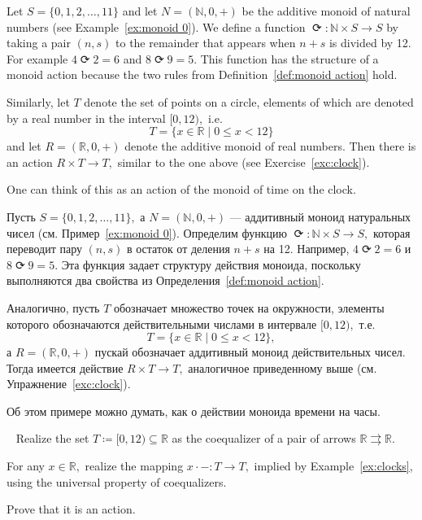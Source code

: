 \documentclass[../main/CT4S-EN-RU]{subfiles}
\begin{document}
\begin{exampleENG}\label{ex:clocks}
Let $S=\{0,1,2,\ldots,11\}$ and let $N=({ℕ},0,+)$ be the additive monoid of natural numbers (see Example~\ref{ex:monoid 0}).  We define a function ${⟳}\colon{ℕ}\times S{→} S$ by taking a pair $(n,s)$ to the remainder that appears when $n+s$ is divided by 12. For example $4{⟳} 2=6$ and $8{⟳} 9 = 5.$ This function has the structure of a monoid action because the two rules from Definition~\ref{def:monoid action} hold.

Similarly, let $T$ denote the set of points on a circle, elements of which are denoted by a real number in the interval $[0,12),$ i.e. $$T=\{x\in{ℝ}{\;|\;}0\leq x< 12\}$$ and let $R=({ℝ},0,+)$ denote the additive monoid of real numbers. Then there is an action $R\times T{→} T,$ similar to the one above (see Exercise~\ref{exc:clock}).

One can think of this as an action of the monoid of time on the clock.
\end{exampleENG}

\begin{exampleRUS}\label{ex:clocks}
Пусть $S=\{0,1,2,\ldots,11\},$ а $N=({ℕ},0,+)$ — аддитивный моноид натуральных чисел (см. Пример~\ref{ex:monoid 0}). Определим функцию ${⟳}\colon{ℕ}\times S{→} S,$ которая переводит пару $(n,s)$ в остаток от деления $n+s$ на 12. Например, $4{⟳} 2=6$ и $8{⟳} 9 = 5.$ Эта функция задает структуру действия моноида, поскольку выполняются два свойства из Определения~\ref{def:monoid action}.

Аналогично, пусть $T$ обозначает множество точек на окружности, элементы которого обозначаются действительными числами в интервале $[0,12),$ т.е. $$T=\{x\in{ℝ}{\;|\;}0\leq x< 12\},$$ а $R=({ℝ},0,+)$ пускай обозначает аддитивный моноид действительных чисел. Тогда имеется действие $R\times T{→} T,$ аналогичное приведенному выше (см. Упражнение~\ref{exc:clock}).

Об этом примере можно думать, как о действии моноида времени на часы.
\end{exampleRUS}

\begin{exerciseENG}\label{exc:clock}~
\sexc Realize the set $T{\coloneqq}[0,12)\subseteq{ℝ}$ as the coequalizer of a pair of arrows ${ℝ}{⇉}{ℝ}.$
\item For any $x\in{ℝ},$ realize the mapping $x\cdot-\colon T{→} T,$ implied by Example~\ref{ex:clocks}, using the universal property of coequalizers.
\item Prove that it is an action.
\endsexc
\end{exerciseENG}
\end{document}
